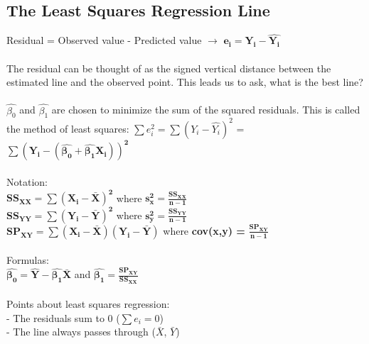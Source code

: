 \documentclass[12pt, a4paper]{article}
\begin{document}
	\subsection{The Least Squares Regression Line}
	Residual = Observed value - Predicted value $\rightarrow$ $\bm{e_i = Y_i - \hat{Y_i}}$ \\~\\
	The residual can be thought of as the signed vertical distance between the estimated line and the observed point. This leads us to ask, what is the best line? \\~\\
	$\hat{\beta_0}$ and $\hat{\beta_1}$ are chosen to minimize the sum of the squared residuals. This is called the method of least squares: $\sum e^2_i = \sum(Y_i-\hat{Y_i})^2$ = \large $\bm{\sum (Y_i - (\hat{\beta_0}+\hat{\beta_1}X_i))^2}$ \normalsize \\~\\
	Notation: \\
	$\bm{SS_{XX} = \sum(X_i-\bar{X})^2}$ where $\bm{s^2_x = \frac{SS_{XX}}{n-1}}$\\
	$\bm{SS_{YY} = \sum(Y_i-\bar{Y})^2}$ where $\bm{s^2_y = \frac{SS_{YY}}{n-1}}$\\
	$\bm{SP_{XY} = \sum(X_i-\bar{X})(Y_i-\bar{Y})}$ where \textbf{cov(x,y) =} $\bm{\frac{SP_{XY}}{n-1}}$\\~\\
	Formulas: \\
	$\bm{\hat{\beta_0} = \hat{Y} - \hat{\beta_1}\bar{X}}$ and $\bm{\hat{\beta_1} = \frac{SP_{XY}}{SS_{XX}}}$ \\~\\
	Points about least squares regression: \\
	- The residuals sum to 0 ($\sum e_i = 0$) \\
	- The line always passes through ($\bar{X}$, $\bar{Y}$) \newpage
	
\end{document}
